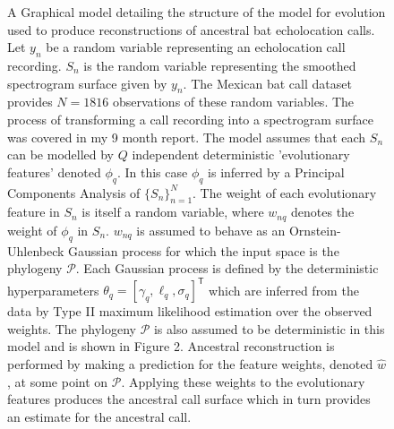 \documentclass[]{article}
\begin{document}
\begin{figure}[htbp]
\centering
{}
\caption{A Graphical model detailing the structure of the model for evolution used to produce reconstructions of ancestral bat echolocation calls. Let \(y_n\) be a random variable representing an echolocation call recording. \(S_n\) is the random variable representing the smoothed spectrogram surface given by \(y_n\). The Mexican bat call dataset provides \(N = 1816\) observations of these random variables. The process of transforming a call recording into a spectrogram surface was covered in my 9 month report. The model assumes that each \(S_n\) can be modelled by \(Q\) independent deterministic 'evolutionary features' denoted \(\phi_q\). In this case \(\phi_q\) is inferred by a Principal Components Analysis of \(\{S_n\}_{n = 1}^N\). The weight of each evolutionary feature in \(S_n\) is itself a random variable, where \(w_{nq}\) denotes the weight of \(\phi_q\) in \(S_n\). \(w_{nq}\) is assumed to behave as an Ornstein-Uhlenbeck Gaussian process for which the input space is the phylogeny \(\mathcal{P}\). Each Gaussian process is defined by the deterministic hyperparameters \(\theta_q = [\gamma_q, \ell_q, \sigma_q]^\mathsf{T}\) which are inferred from the data by Type II maximum likelihood estimation over the observed weights. The phylogeny \(\mathcal{P}\) is also assumed to be deterministic in this model and is shown in Figure 2. Ancestral reconstruction is performed by making a prediction for the feature weights, denoted \(\hat{w}\), at some point on \(\mathcal{P}\). Applying these weights to the evolutionary features produces the ancestral call surface which in turn provides an estimate for the ancestral call.}
\label{fig:current}
\end{figure}
\end{document}
